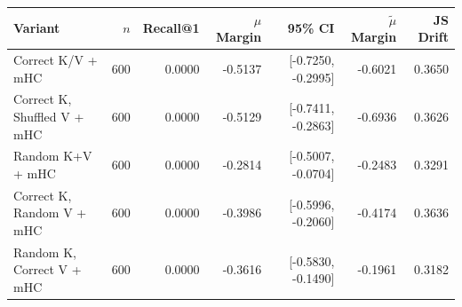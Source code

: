\begin{tabular}{l r r r r r r}
\toprule
Variant & $n$ & Recall@1 & $\mu$ Margin & 95\% CI & $\tilde{\mu}$ Margin & JS Drift \\
\midrule
Correct K/V + mHC & 600 & 0.0000 & -0.5137 & [-0.7250, -0.2995] & -0.6021 & 0.3650 \\
Correct K, Shuffled V + mHC & 600 & 0.0000 & -0.5129 & [-0.7411, -0.2863] & -0.6936 & 0.3626 \\
Random K+V + mHC & 600 & 0.0000 & -0.2814 & [-0.5007, -0.0704] & -0.2483 & 0.3291 \\
Correct K, Random V + mHC & 600 & 0.0000 & -0.3986 & [-0.5996, -0.2060] & -0.4174 & 0.3636 \\
Random K, Correct V + mHC & 600 & 0.0000 & -0.3616 & [-0.5830, -0.1490] & -0.1961 & 0.3182 \\
\bottomrule
\end{tabular}
